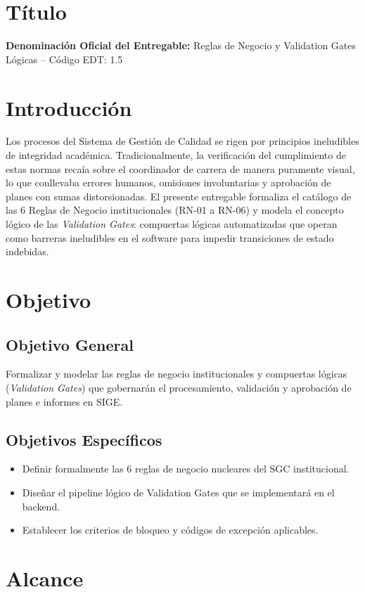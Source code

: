 \documentclass[12pt,a4paper]{article}
\begin{document}
\section{Título}
\textbf{Denominación Oficial del Entregable:} Reglas de Negocio y Validation Gates Lógicas -- Código EDT: 1.5

\section{Introducción}
Los procesos del Sistema de Gestión de Calidad se rigen por principios ineludibles de integridad académica. Tradicionalmente, la verificación del cumplimiento de estas normas recaía sobre el coordinador de carrera de manera puramente visual, lo que conllevaba errores humanos, omisiones involuntarias y aprobación de planes con sumas distorsionadas. El presente entregable formaliza el catálogo de las 6 Reglas de Negocio institucionales (RN-01 a RN-06) y modela el concepto lógico de las \textit{Validation Gates}: compuertas lógicas automatizadas que operan como barreras ineludibles en el software para impedir transiciones de estado indebidas.

\section{Objetivo}
\subsection{Objetivo General}
Formalizar y modelar las reglas de negocio institucionales y compuertas lógicas (\textit{Validation Gates}) que gobernarán el procesamiento, validación y aprobación de planes e informes en SIGE.
\subsection{Objetivos Específicos}
\begin{itemize}[leftmargin=1.5em, itemsep=2pt]
    \item Definir formalmente las 6 reglas de negocio nucleares del SGC institucional.
    \item Diseñar el pipeline lógico de Validation Gates que se implementará en el backend.
    \item Establecer los criterios de bloqueo y códigos de excepción aplicables.
\end{itemize}

\section{Alcance}
\end{document}
